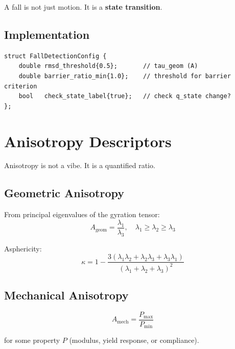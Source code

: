 \documentclass[11pt]{article}
\begin{document}
A fall is not just motion. It is a \textbf{state transition}.

\subsection{Implementation}

\begin{lstlisting}[caption={Fall detection in C++ (emergence\_dataset.hpp)}]
struct FallDetectionConfig {
    double rmsd_threshold{0.5};       // tau_geom (A)
    double barrier_ratio_min{1.0};    // threshold for barrier criterion
    bool   check_state_label{true};   // check q_state change?
};
\end{lstlisting}

\section{Anisotropy Descriptors}

Anisotropy is not a vibe. It is a quantified ratio.

\subsection{Geometric Anisotropy}

From principal eigenvalues of the gyration tensor:
\begin{equation}
A_{\text{geom}} = \frac{\lambda_1}{\lambda_3}, \quad \lambda_1 \geq \lambda_2 \geq \lambda_3
\end{equation}

Asphericity:
\begin{equation}
\kappa = 1 - \frac{3(\lambda_1 \lambda_2 + \lambda_2 \lambda_3 + \lambda_3 \lambda_1)}{(\lambda_1 + \lambda_2 + \lambda_3)^2}
\end{equation}

\subsection{Mechanical Anisotropy}

\begin{equation}
A_{\text{mech}} = \frac{P_{\max}}{P_{\min}}
\end{equation}

for some property $P$ (modulus, yield response, or compliance).
\end{document}

